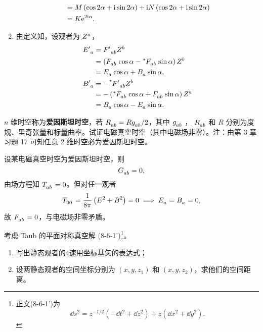 \begin{xiti}
\begin{zm}
\begin{enumerate}[label = (\alph*)]
\begin{equation*}
\begin{split}
					&= M \left( \cos 2\alpha + \mathrm{i} \sin 2 \alpha \right) + \mathrm{i} N \left( \cos 2 \alpha + \mathrm{i} \sin 2 \alpha \right)\\
					&= K \mathrm{e}^{2\mathrm{i} \alpha}.
				\end{split}
			\end{equation*}
			\item 由定义知，设观者为 $\tensor{Z}{^a}$，
			\begin{align*}
				\tensor{{E'}}{_a} &= \tensor{{F'}}{_a_b} \tensor{Z}{^b}\\
				&= \left( \tensor{F}{_a_b} \cos \alpha - \tensor[^*]{F}{_a_b} \sin \alpha \right) \tensor{Z}{^b}\\
				&= \tensor{E}{_a} \cos \alpha + \tensor{B}{_a} \sin \alpha,\\
				\tensor{{B'}}{_a} &= - \tensor[^*]{{F'}}{_a_b} \tensor{Z}{^b}\\
				&= - \left( \tensor[^*]{F}{_a_b} \cos \alpha + \tensor{F}{_a_b} \sin \alpha \right) \tensor{Z}{^a}\\
				&= \tensor{B}{_a} \cos \alpha - \tensor{E}{_a} \sin \alpha.
			\end{align*}
		\end{enumerate}
	\end{zm}

	\item $n$ 维时空称为\textbf{爱因斯坦时空}，若 $\tensor{R}{_a_b} = R \tensor{g}{_a_b}/2$，其中 $\tensor{g}{_a_b}$ ， $\tensor{R}{_a_b}$ 和 $R$ 分别为度规、里奇张量和标量曲率。试证电磁真空时空（其中电磁场非零）。注：由第 3 章习题 17 可知任意 2 维时空必为爱因斯坦时空。
	
	\begin{zm}
		设某电磁真空时空为爱因斯坦时空，则
		\begin{equation*}
			\tensor{G}{_a_b} = 0,
		\end{equation*}
		由场方程知 $\tensor{T}{_a_b} = 0$。但对任一观者
		\begin{equation*}
			\tensor{T}{_0_0} = \frac{1}{8\pi} \left( E^2 + B^2 \right) = 0 \implies \tensor{E}{_a} = \tensor{B}{_a} = 0,
		\end{equation*}
		故 $\tensor{F}{_a_b} = 0$，与电磁场非零矛盾。
	\end{zm}

	\item 考虑 Taub 的平面对称真空解 (8-6-1')\footnote{正文(8-6-1')为
	\begin{equation*}
		\dd{s}^2 = z^{-1/2} \left( -\dd{t}^2 + \dd{z}^2 \right) + z \left( \dd{x}^2 + \dd{y}^2 \right). \tag{8-6-1'}
	\end{equation*}
	}。
	\begin{enumerate}[label=(\alph*)]
		\item 写出静态观者的4速用坐标基矢的表达式；
		\item 设两静态观者的空间坐标分别为 $(x,y,z_1)$ 和 $(x,y,z_2)$，求他们的空间距离。
	\end{enumerate}


\end{xiti}
